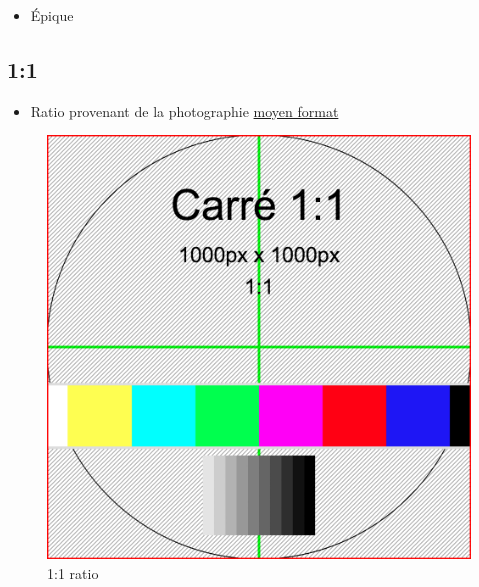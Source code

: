 \documentclass[
  french,
]{book}
\providecommand{\tightlist}{%
  \setlength{\itemsep}{0pt}\setlength{\parskip}{0pt}}
\begin{document}
\begin{itemize}
\tightlist
\item
  Épique
\end{itemize}

\hypertarget{section-5}{%
\subsection{1:1}\label{section-5}}

\begin{itemize}
\tightlist
\item
  Ratio provenant de la photographie \href{https://fr.wikipedia.org/wiki/Appareil_photographique_de_moyen_format}{moyen format}
\end{itemize}

\begin{figure}
\centering
\includegraphics{medias/lexique/carre_1_1_1000x1000.png}
\caption{1:1 ratio}
\end{figure}
\end{document}
